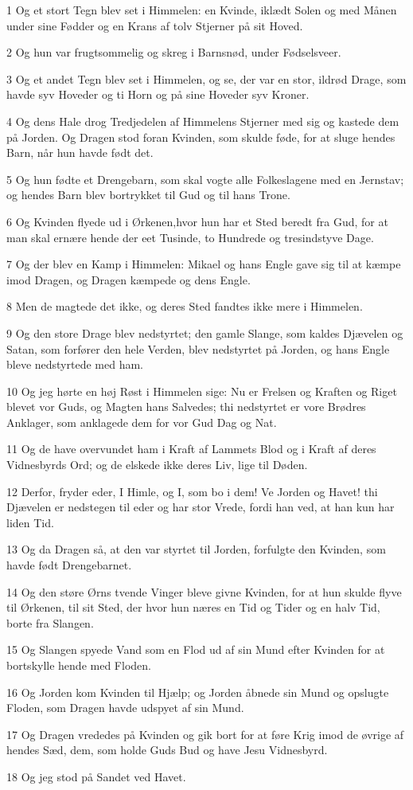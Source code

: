 \par 1 Og et stort Tegn blev set i Himmelen: en Kvinde, iklædt Solen og med Månen under sine Fødder og en Krans af tolv Stjerner på sit Hoved.
\par 2 Og hun var frugtsommelig og skreg i Barnsnød, under Fødselsveer.
\par 3 Og et andet Tegn blev set i Himmelen, og se, der var en stor, ildrød Drage, som havde syv Hoveder og ti Horn og på sine Hoveder syv Kroner.
\par 4 Og dens Hale drog Tredjedelen af Himmelens Stjerner med sig og kastede dem på Jorden. Og Dragen stod foran Kvinden, som skulde føde, for at sluge hendes Barn, når hun havde født det.
\par 5 Og hun fødte et Drengebarn, som skal vogte alle Folkeslagene med en Jernstav; og hendes Barn blev bortrykket til Gud og til hans Trone.
\par 6 Og Kvinden flyede ud i Ørkenen,hvor hun har et Sted beredt fra Gud, for at man skal ernære hende der eet Tusinde, to Hundrede og tresindstyve Dage.
\par 7 Og der blev en Kamp i Himmelen: Mikael og hans Engle gave sig til at kæmpe imod Dragen, og Dragen kæmpede og dens Engle.
\par 8 Men de magtede det ikke, og deres Sted fandtes ikke mere i Himmelen.
\par 9 Og den store Drage blev nedstyrtet; den gamle Slange, som kaldes Djævelen og Satan, som forfører den hele Verden, blev nedstyrtet på Jorden, og hans Engle bleve nedstyrtede med ham.
\par 10 Og jeg hørte en høj Røst i Himmelen sige: Nu er Frelsen og Kraften og Riget blevet vor Guds, og Magten hans Salvedes; thi nedstyrtet er vore Brødres Anklager, som anklagede dem for vor Gud Dag og Nat.
\par 11 Og de have overvundet ham i Kraft af Lammets Blod og i Kraft af deres Vidnesbyrds Ord; og de elskede ikke deres Liv, lige til Døden.
\par 12 Derfor, fryder eder, I Himle, og I, som bo i dem! Ve Jorden og Havet! thi Djævelen er nedstegen til eder og har stor Vrede, fordi han ved, at han kun har liden Tid.
\par 13 Og da Dragen så, at den var styrtet til Jorden, forfulgte den Kvinden, som havde født Drengebarnet.
\par 14 Og den støre Ørns tvende Vinger bleve givne Kvinden, for at hun skulde flyve til Ørkenen, til sit Sted, der hvor hun næres en Tid og Tider og en halv Tid, borte fra Slangen.
\par 15 Og Slangen spyede Vand som en Flod ud af sin Mund efter Kvinden for at bortskylle hende med Floden.
\par 16 Og Jorden kom Kvinden til Hjælp; og Jorden åbnede sin Mund og opslugte Floden, som Dragen havde udspyet af sin Mund.
\par 17 Og Dragen vrededes på Kvinden og gik bort for at føre Krig imod de øvrige af hendes Sæd, dem, som holde Guds Bud og have Jesu Vidnesbyrd.
\par 18 Og jeg stod på Sandet ved Havet.

